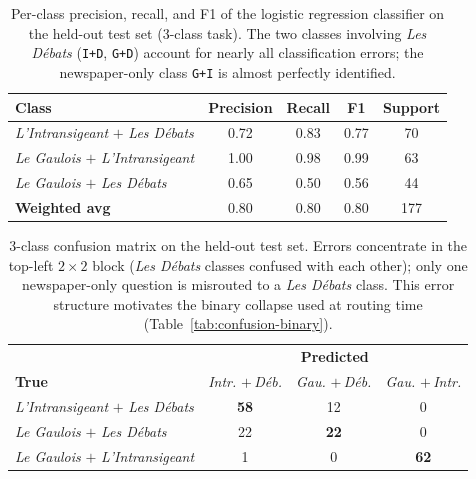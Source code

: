 \begin{table}[htbp]
\centering
\small
\begin{tabular}{lcccc}
\toprule
\textbf{Class} & \textbf{Precision} & \textbf{Recall} & \textbf{F1} & \textbf{Support} \\
\midrule
\textit{L'Intransigeant} $+$ \textit{Les Débats}  & 0.72 & 0.83 & 0.77 & 70 \\
\textit{Le Gaulois} $+$ \textit{L'Intransigeant}  & 1.00 & 0.98 & 0.99 & 63 \\
\textit{Le Gaulois} $+$ \textit{Les Débats}        & 0.65 & 0.50 & 0.56 & 44 \\
\midrule
\textbf{Weighted avg}                              & 0.80 & 0.80 & 0.80 & 177 \\
\bottomrule
\end{tabular}
\caption{Per-class precision, recall, and F1 of the logistic regression
classifier on the held-out test set (3-class task).
The two classes involving \textit{Les Débats} (\texttt{I+D}, \texttt{G+D})
account for nearly all classification errors; the newspaper-only class
\texttt{G+I} is almost perfectly identified.}
\label{tab:clf-report}
\end{table}

\begin{table}[htbp]
\centering
\small
\setlength{\tabcolsep}{5pt}
\begin{tabular}{l ccc}
\toprule
 & \multicolumn{3}{c}{\textbf{Predicted}} \\
\cmidrule(lr){2-4}
\textbf{True}
  & \makecell{\textit{Intr.}\\$+$\,\textit{Déb.}}
  & \makecell{\textit{Gau.}\\$+$\,\textit{Déb.}}
  & \makecell{\textit{Gau.}\\$+$\,\textit{Intr.}} \\
\midrule
\textit{L'Intransigeant} $+$ \textit{Les Débats} & \textbf{58} &  12 &   0 \\
\textit{Le Gaulois} $+$ \textit{Les Débats}      &  22 & \textbf{22} &   0 \\
\textit{Le Gaulois} $+$ \textit{L'Intransigeant} &   1 &   0 & \textbf{62} \\
\bottomrule
\end{tabular}
\caption{3-class confusion matrix on the held-out test set.
Errors concentrate in the top-left $2{\times}2$ block (\textit{Les Débats}
classes confused with each other); only one newspaper-only question is
misrouted to a \textit{Les Débats} class.
This error structure motivates the binary collapse used at routing time
(Table~\ref{tab:confusion-binary}).}
\label{tab:confusion}
\end{table}